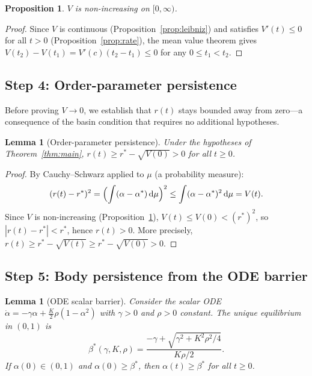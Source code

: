 \documentclass[11pt,a4paper]{article}
\newtheorem{lemma}[theorem]{Lemma}
\newtheorem{proposition}[theorem]{Proposition}
\theoremstyle{definition}
\begin{document}
\begin{proposition}\label{prop:antitone}
$V$ is non-increasing on $[0,\infty)$.
\end{proposition}

\begin{proof}
Since $V$ is continuous (Proposition~\ref{prop:leibniz}) and satisfies $V'(t)\leq 0$ for all $t>0$ (Proposition~\ref{prop:rate}), the mean value theorem gives $V(t_2)-V(t_1)=V'(c)(t_2-t_1)\leq 0$ for any $0\leq t_1<t_2$.
\end{proof}

\subsection{Step 4: Order-parameter persistence}\label{sec:persistence}

Before proving $V\to 0$, we establish that $r(t)$ stays bounded away from zero---a consequence of the basin condition that requires no additional hypotheses.

\begin{lemma}[Order-parameter persistence]\label{lem:rpersist}
Under the hypotheses of Theorem~\ref{thm:main}, $r(t) \geq r^*-\sqrt{V(0)} > 0$ for all $t\geq 0$.
\end{lemma}

\begin{proof}
By Cauchy--Schwarz applied to $\mu$ (a probability measure):
\[
(r(t)-r^*)^2 = \Bigl(\int(\alpha-\alpha^*)\,\mathrm{d}\mu\Bigr)^2 \leq \int(\alpha-\alpha^*)^2\,\mathrm{d}\mu = V(t).
\]
Since $V$ is non-increasing (Proposition~\ref{prop:antitone}), $V(t)\leq V(0)<(r^*)^2$, so $|r(t)-r^*|<r^*$, hence $r(t)>0$. More precisely, $r(t)\geq r^*-\sqrt{V(t)}\geq r^*-\sqrt{V(0)}>0$.
\end{proof}

\subsection{Step 5: Body persistence from the ODE barrier}\label{sec:body}

\begin{lemma}[ODE scalar barrier]\label{lem:barrier}
Consider the scalar ODE $\dot\alpha = -\gamma\alpha + \tfrac{K}{2}\rho(1-\alpha^2)$ with $\gamma>0$ and $\rho>0$ constant. The unique equilibrium in $(0,1)$ is
\begin{equation}\label{eq:explicit-equil}
\beta^*(\gamma,K,\rho) = \frac{-\gamma+\sqrt{\gamma^2+K^2\rho^2/4}}{K\rho/2}.
\end{equation}
If $\alpha(0)\in(0,1)$ and $\alpha(0)\geq\beta^*$, then $\alpha(t)\geq\beta^*$ for all $t\geq 0$.
\end{lemma}
\end{document}
